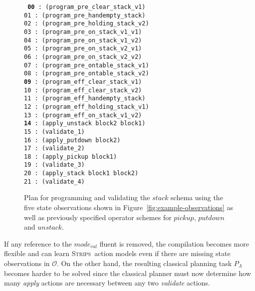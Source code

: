 \documentclass[3p,times]{elsarticle}
\newcommand{\strips}{\textsc{Strips}}     %
\begin{document}
\begin{figure}[hbt!]
{\footnotesize\tt
     {\bf 00} : (program\_pre\_clear\_stack\_v1)\\
     01 : (program\_pre\_handempty\_stack)\\
     02 : (program\_pre\_holding\_stack\_v2)\\
     03 : (program\_pre\_on\_stack\_v1\_v1)\\
     04 : (program\_pre\_on\_stack\_v1\_v2)\\
     05 : (program\_pre\_on\_stack\_v2\_v1)\\
     06 : (program\_pre\_on\_stack\_v2\_v2)\\
     07 : (program\_pre\_ontable\_stack\_v1)\\
     08 : (program\_pre\_ontable\_stack\_v2)\\
     {\bf 09} : (program\_eff\_clear\_stack\_v1)\\
    10 : (program\_eff\_clear\_stack\_v2)\\
    11 : (program\_eff\_handempty\_stack)\\
    12 : (program\_eff\_holding\_stack\_v1)\\
    13 : (program\_eff\_on\_stack\_v1\_v2)\\
    {\bf 14} : (apply\_unstack block2 block1)\\
    15 : (validate\_1)\\
    16 : (apply\_putdown block2)\\
    17 : (validate\_2)\\
    18 : (apply\_pickup block1)\\
    19 : (validate\_3)\\
    20 : (apply\_stack block1 block2)\\
    21 : (validate\_4)
}
 \caption{\small Plan for programming and validating the $stack$ schema using the five state observations shown in Figure~\ref{fig:example-observations} as well as previously specified operator schemes for $pickup$, $putdown$ and $unstack$.}
\label{fig:plan-observations}
\end{figure}

If any reference to the $mode_{val}$ fluent is removed, the compilation becomes more flexible and can learn \strips\ action models even if there are missing state observations in $\mathcal{O}$. On the other hand, the resulting classical planning task $P_{\Lambda}$ becomes harder to be solved since the classical planner must now determine how many {\em apply} actions are necessary between any two {\em validate} actions.  
\end{document}
